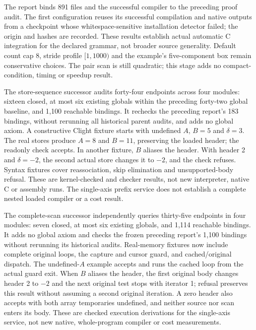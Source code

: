 The report binds 891 files and the successful compiler to the preceding
proof audit. The first configuration reuses its successful compilation and
native outputs from a checkpoint whose whitespace-sensitive installation
detector failed; the origin and hashes are recorded. These results establish
actual automatic C integration for the declared grammar, not broader source
generality. Default count cap 8, stride profile $[1,1000)$ and the example's
five-component box remain conservative choices. The pair scan is still
quadratic; this stage adds no compact-condition, timing or speedup result.

The store-sequence successor audits forty-four endpoints across four modules:
sixteen closed, at most six existing globals within the preceding forty-two
global baseline, and 1,100 reachable bindings. It rechecks the preceding
report's 183 bindings, without rerunning all historical parent audits, and adds
no global axiom. A constructive Clight fixture starts with undefined $A$,
$B=5$ and $\delta=3$. The real stores produce $A=8$ and $B=11$, preserving the
loaded header; the readonly check accepts. In another fixture, $B$ aliases
the header. With header 2 and $\delta=-2$, the second actual store changes it
to $-2$, and the check refuses. Syntax fixtures cover reassociation, skip
elimination and unsupported-body refusal. These are kernel-checked
 and checker results, not new interpreter, native C or
assembly runs. The single-axis prefix service does not establish a complete
nested loaded compiler or a cost result.

The complete-scan successor independently queries thirty-five endpoints in
four modules: seven closed, at most six existing globals, and 1,114 reachable
bindings. It adds no global axiom and checks the frozen preceding report's
1,100 bindings without rerunning its historical audits. Real-memory
 fixtures now include complete original loops, the capture and
cursor guard, and cached/original dispatch. The undefined-$A$ example accepts
and runs the cached loop from the actual guard exit. When $B$ aliases the
header, the first original body changes header 2 to $-2$ and the next original
test stops with iterator 1; refusal preserves this result without assuming a
second original iteration. A zero header also accepts with both array
temporaries undefined, and neither source nor scan enters its body. These are
checked execution derivations for the single-axis service, not new native,
whole-program compiler or cost measurements.

